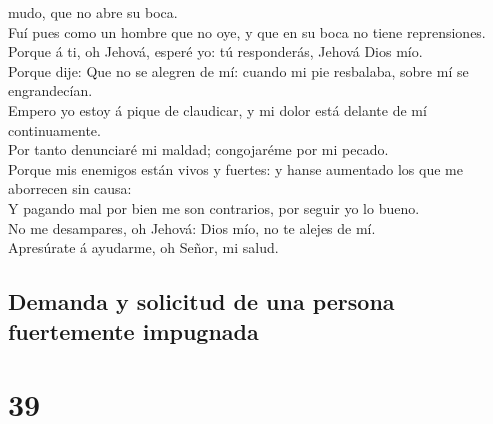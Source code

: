 mudo, que no abre su boca.\\
 Fuí pues como un hombre que no oye, y que en su boca no
tiene reprensiones.\\
 Porque á ti, oh Jehová, esperé yo: tú responderás, Jehová
Dios mío.\\
 Porque dije: Que no se alegren de mí: cuando mi pie
resbalaba, sobre mí se engrandecían.\\
 Empero yo estoy á pique de claudicar, y mi dolor está
delante de mí continuamente.\\
 Por tanto denunciaré mi maldad; congojaréme por mi
pecado.\\
 Porque mis enemigos están vivos y fuertes: y hanse
aumentado los que me aborrecen sin causa:\\
 Y pagando mal por bien me son contrarios, por seguir yo lo
bueno.\\
 No me desampares, oh Jehová: Dios mío, no te alejes de
mí.\\
 Apresúrate á ayudarme, oh Señor, mi salud.

\hypertarget{demanda-y-solicitud-de-una-persona-fuertemente-impugnada}{%
\subsection{Demanda y solicitud de una persona fuertemente
impugnada}\label{demanda-y-solicitud-de-una-persona-fuertemente-impugnada}}

\hypertarget{section-38}{%
\section{39}\label{section-38}}

